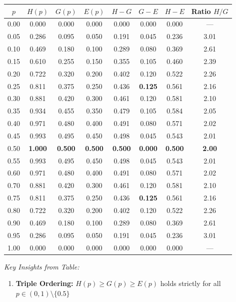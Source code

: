 \documentclass[12pt]{article}
\begin{document}
\begin{explanation}
\begin{center}
\begin{tabular}{|c|c|c|c|c|c|c|c|}
\hline
\textbf{$p$} & \textbf{$H(p)$} & \textbf{$G(p)$} & \textbf{$E(p)$} & \textbf{$H-G$} & \textbf{$G-E$} & \textbf{$H-E$} & \textbf{Ratio $H/G$} \\
\hline
0.00 & 0.000 & 0.000 & 0.000 & 0.000 & 0.000 & 0.000 & — \\
0.05 & 0.286 & 0.095 & 0.050 & 0.191 & 0.045 & 0.236 & 3.01 \\
0.10 & 0.469 & 0.180 & 0.100 & 0.289 & 0.080 & 0.369 & 2.61 \\
0.15 & 0.610 & 0.255 & 0.150 & 0.355 & 0.105 & 0.460 & 2.39 \\
0.20 & 0.722 & 0.320 & 0.200 & 0.402 & 0.120 & 0.522 & 2.26 \\
0.25 & 0.811 & 0.375 & 0.250 & 0.436 & \textbf{0.125} & 0.561 & 2.16 \\
0.30 & 0.881 & 0.420 & 0.300 & 0.461 & 0.120 & 0.581 & 2.10 \\
0.35 & 0.934 & 0.455 & 0.350 & 0.479 & 0.105 & 0.584 & 2.05 \\
0.40 & 0.971 & 0.480 & 0.400 & 0.491 & 0.080 & 0.571 & 2.02 \\
0.45 & 0.993 & 0.495 & 0.450 & 0.498 & 0.045 & 0.543 & 2.01 \\
0.50 & \textbf{1.000} & \textbf{0.500} & \textbf{0.500} & \textbf{0.500} & \textbf{0.000} & \textbf{0.500} & \textbf{2.00} \\
0.55 & 0.993 & 0.495 & 0.450 & 0.498 & 0.045 & 0.543 & 2.01 \\
0.60 & 0.971 & 0.480 & 0.400 & 0.491 & 0.080 & 0.571 & 2.02 \\
0.70 & 0.881 & 0.420 & 0.300 & 0.461 & 0.120 & 0.581 & 2.10 \\
0.75 & 0.811 & 0.375 & 0.250 & 0.436 & \textbf{0.125} & 0.561 & 2.16 \\
0.80 & 0.722 & 0.320 & 0.200 & 0.402 & 0.120 & 0.522 & 2.26 \\
0.90 & 0.469 & 0.180 & 0.100 & 0.289 & 0.080 & 0.369 & 2.61 \\
0.95 & 0.286 & 0.095 & 0.050 & 0.191 & 0.045 & 0.236 & 3.01 \\
1.00 & 0.000 & 0.000 & 0.000 & 0.000 & 0.000 & 0.000 & — \\
\hline
\end{tabular}
\end{center}

\textit{Key Insights from Table:}

\begin{enumerate}
    \item \textbf{Triple Ordering:} $H(p) \geq G(p) \geq E(p)$ holds strictly for all $p \in (0,1) \setminus \{0.5\}$


\end{enumerate}
\end{explanation}
\end{document}
